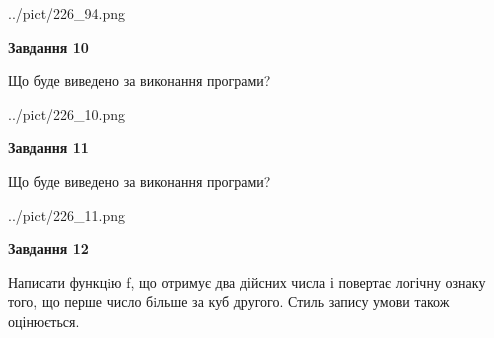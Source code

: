 \documentclass[12pt, ukrainian]{article}
\begin{document}
{\begin {large}
\begin{center}
	{../pict/226_94.png}
\end{center}
\newpage

{\begin {center}\textbf{Завдання 10}\end {center}}

Що буде виведено за виконання програми?\par
\begin{center}
	{../pict/226_10.png}
\end{center}
\newpage

{\begin {center}\textbf{Завдання 11}\end {center}}

Що буде виведено за виконання програми?\par
\begin{center}
	{../pict/226_11.png}
\end{center}
\newpage

{\begin {center}\textbf{Завдання 12}\end {center}}


Написати функцiю f, що отримує два дійсних числа і повертає логічну ознаку того, що перше число бiльше за куб другого. Стиль запису умови також оцінюється.\par
\newpage

\end {large}}
\end{document}
